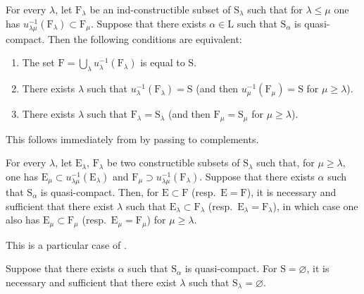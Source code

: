 \begin{corollary}[8.3.4]
\label{IV.8.3.4}
For every $\lambda$, let $\mathrm{F}_\lambda$ be an ind-constructible subset of $\mathrm{S}_\lambda$ such that for $\lambda\leqslant\mu$ one has $u_{\lambda\mu}^{-1}(\mathrm{F}_\lambda)\subset\mathrm{F}_\mu$.
Suppose that there exists $\alpha\in\mathrm{L}$ such that $\mathrm{S}_\alpha$ is quasi-compact.
Then the following conditions are equivalent:
\begin{enumerate}[label=\emph{\alph*)}]
  \item The set $\mathrm{F}=\bigcup_\lambda u_\lambda^{-1}(\mathrm{F}_\lambda)$ is equal to $\mathrm{S}$.
  \item There exists $\lambda$ such that $u_\lambda^{-1}(\mathrm{F}_\lambda)=\mathrm{S}$ (and then $u_\mu^{-1}(\mathrm{F}_\mu)=\mathrm{S}$ for $\mu\geqslant\lambda$).
  \item There exists $\lambda$ such that $\mathrm{F}_\lambda=\mathrm{S}_\lambda$ (and then $\mathrm{F}_\mu=\mathrm{S}_\mu$ for $\mu\geqslant\lambda$).
\end{enumerate}
This follows immediately from  by passing to complements.
\end{corollary}

\begin{corollary}[8.3.5]
\label{IV.8.3.5}
For every $\lambda$, let $\mathrm{E}_\lambda$, $\mathrm{F}_\lambda$ be two constructible subsets of $\mathrm{S}_\lambda$ such that, for $\mu\geqslant\lambda$, one has $\mathrm{E}_\mu\subset u_{\lambda\mu}^{-1}(\mathrm{E}_\lambda)$ and $\mathrm{F}_\mu\supset u_{\lambda\mu}^{-1}(\mathrm{F}_\lambda)$.
Suppose that there exists $\alpha$ such that $\mathrm{S}_\alpha$ is quasi-compact.
Then, for $\mathrm{E}\subset\mathrm{F}$ \textnormal{(}resp.\ $\mathrm{E}=\mathrm{F}$\textnormal{)}, it is necessary and sufficient that there exist $\lambda$ such that $\mathrm{E}_\lambda\subset\mathrm{F}_\lambda$ \textnormal{(}resp.\ $\mathrm{E}_\lambda=\mathrm{F}_\lambda$\textnormal{)}, in which case one also has $\mathrm{E}_\mu\subset\mathrm{F}_\mu$ \textnormal{(}resp.\ $\mathrm{E}_\mu=\mathrm{F}_\mu$\textnormal{)} for $\mu\geqslant\lambda$.

This is a particular case of .
\end{corollary}

\begin{corollary}[8.3.6]
\label{IV.8.3.6}
Suppose that there exists $\alpha$ such that $\mathrm{S}_\alpha$ is quasi-compact.
For $\mathrm{S}=\varnothing$, it is necessary and sufficient that there exist $\lambda$ such that $\mathrm{S}_\lambda=\varnothing$.
\end{corollary}

